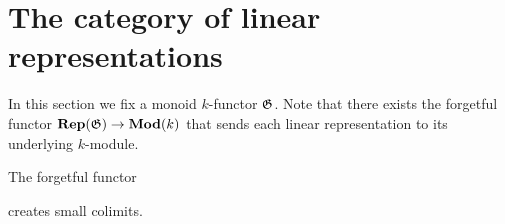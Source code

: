 \section{The category of linear representations}
\noindent
In this section we fix a monoid $k$-functor ${\mathfrak G}$. Note that there exists the forgetful functor $\mathbf{Rep}({\mathfrak G})\rightarrow \mathbf{Mod}(k)$ that sends each linear representation to its underlying $k$-module.

\begin{theorem}\label{theorem:forgetful_functor_from_reps_creates_colmits_and_flimits}
The forgetful functor
\begin{center}
\end{center}
creates small colimits.
\end{theorem}
